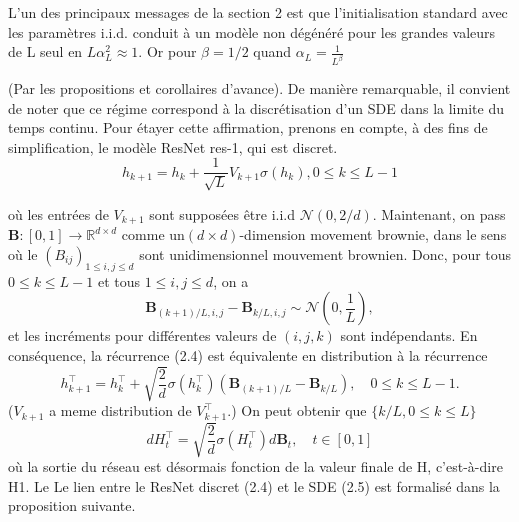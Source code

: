 L'un des principaux messages de la section 2 est que l'initialisation standard avec les paramètres i.i.d. conduit à un modèle non dégénéré pour les grandes valeurs de L seul en 
$L\alpha_L^2 \approx 1$. Or pour $\beta = 1/2$ quand $\alpha_L=\frac{1}{L^{\beta}}$ 

(Par les propositions et corollaires d'avance). De manière remarquable, il convient de noter que ce régime correspond à la discrétisation d'un SDE dans la limite du temps continu. Pour étayer cette affirmation, prenons en compte, à des fins de simplification, le modèle ResNet res-1, qui est discret.
\begin{equation}
    h_{k+1} = h_k + \frac{1}{\sqrt{L}}V_{k+1}\sigma(h_k) , 0 \leq k \leq L-1 
\end{equation}

où les entrées de $V_{k+1}$ sont supposées être i.i.d $\mathcal{N}(0,2/d)$.
Maintenant, on pass $\mathbf{B}:[0,1] \rightarrow \mathbb{R}^{d \times d}$ comme un$(d \times d)$-dimension movement brownie, dans le sens où le $\left(B_{i j}\right)_{1 \leqslant i, j \leqslant d}$ sont unidimensionnel mouvement brownien. Donc, pour tous $0 \leqslant k \leqslant L-1$ et tous $1 \leqslant i, j \leqslant d$, on a
$$
\mathbf{B}_{(k+1) / L, i, j}-\mathbf{B}_{k / L, i, j} \sim \mathcal{N}\left(0, \frac{1}{L}\right),
$$
et les incréments pour différentes valeurs de $(i, j, k)$ sont indépendants. En conséquence, la récurrence (2.4) est équivalente en distribution à la récurrence
$$
h_{k+1}^{\top}=h_k^{\top}+\sqrt{\frac{2}{d}} \sigma\left(h_k^{\top}\right)\left(\mathbf{B}_{(k+1) / L}-\mathbf{B}_{k / L}\right), \quad 0 \leqslant k \leqslant L-1 .
$$
($V_{k+1}$ a meme distribution de $V_{k+1}^{\top}$.) On peut obtenir que $\{k / L, 0 \leqslant k \leqslant L\}$ 
\begin{equation}
    d H_t^{\top}=\sqrt{\frac{2}{d}} \sigma\left(H_t^{\top}\right) d \mathbf{B}_t, \quad t \in[0,1]
\end{equation}
où la sortie du réseau est désormais fonction de la valeur finale de H, c'est-à-dire H1. Le
Le lien entre le ResNet discret (2.4) et le SDE (2.5) est formalisé dans la proposition suivante.


